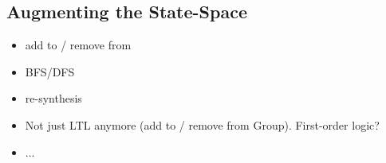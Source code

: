 \subsection{Augmenting the State-Space} %

\begin{itemize}
	\item add to / remove from
	\item BFS/DFS
	\item re-synthesis
	\item Not just LTL anymore (add to / remove from Group). First-order logic?
	\item ...
\end{itemize}

